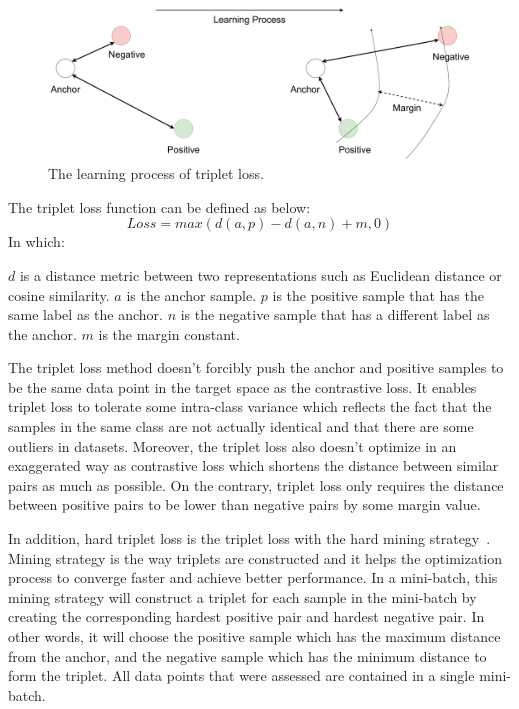 \documentclass[../main.tex]{subfiles}
\begin{document}
\begin{figure}[h!]
\centering
\includegraphics[width=\linewidth]{Figure/triplet.pdf}
\caption{The learning process of triplet loss.}
\label{fig:triplet}
\end{figure}

The triplet loss function can be defined as below:
\begin{equation}\label{eq:triplet}
    Loss = max(d(a, p) - d(a, n) + m, 0)
\end{equation}
In which:
\begin{outline}
 \1 $d$ is a distance metric between two representations such as Euclidean distance or cosine similarity.
 \1 $a$ is the anchor sample.
 \1 $p$ is the positive sample that has the same label as the anchor.
 \1 $n$ is the negative sample that has a different label as the anchor.
 \1 $m$ is the margin constant.
\end{outline}

The triplet loss method doesn't forcibly push the anchor and positive samples to be the same data point in the target space as the contrastive loss. It enables triplet loss to tolerate some intra-class variance which reflects the fact that the samples in the same class are not actually identical and that there are some outliers in datasets. Moreover, the triplet loss also doesn't optimize in an exaggerated way as contrastive loss which shortens the distance between similar pairs as much as possible. On the contrary, triplet loss only requires the distance between positive pairs to be lower than negative pairs by some margin value.

In addition, hard triplet loss is the triplet loss with the hard mining strategy~\cite{hermans2017defense}. Mining strategy is the way triplets are constructed and it helps the optimization process to converge faster and achieve better performance. In a mini-batch, this mining strategy will construct a triplet for each sample in the mini-batch by creating the corresponding hardest positive pair and hardest negative pair. In other words, it will choose the positive sample which has the maximum distance from the anchor, and the negative sample which has the minimum distance to form the triplet. All data points that were assessed are contained in a single mini-batch.
\end{document}
